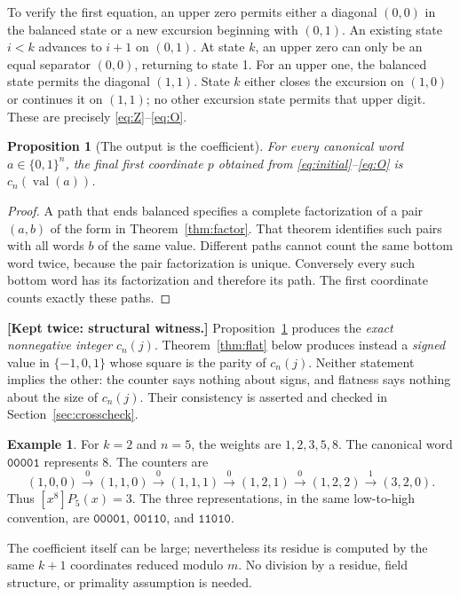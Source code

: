 \documentclass[11pt,letterpaper]{article}
\numberwithin{equation}{section}
\newtheorem{proposition}[theorem]{Proposition}
\theoremstyle{definition}
\newtheorem{example}[theorem]{Example}
\theoremstyle{remark}
\newcommand{\val}{\operatorname{val}}
\newcommand{\bits}[1]{\mathtt{#1}}
\begin{document}
To verify the first equation, an upper zero permits either a diagonal
$(0,0)$ in the balanced state or a new excursion beginning with $(0,1)$.
An existing state $i<k$ advances to $i+1$ on $(0,1)$. At state $k$, an
upper zero can only be an equal separator $(0,0)$, returning to state 1.
For an upper one, the balanced state permits the diagonal $(1,1)$.
State $k$ either closes the excursion on $(1,0)$ or continues it on
$(1,1)$; no other excursion state permits that upper digit. These are
precisely \eqref{eq:Z}--\eqref{eq:O}.

\begin{proposition}[The output is the coefficient]
\label{prop:counter}
For every canonical word $a\in\{0,1\}^n$, the final first coordinate $p$
obtained from \eqref{eq:initial}--\eqref{eq:O} is $c_n(\val(a))$.
\end{proposition}
\begin{proof}
A path that ends balanced specifies a complete factorization of a pair
$(a,b)$ of the form in Theorem~\ref{thm:factor}. That theorem identifies
such pairs with all words $b$ of the same value. Different paths cannot
count the same bottom word twice, because the pair factorization is
unique. Conversely every such bottom word has its factorization and
therefore its path. The first coordinate counts exactly these paths.
\end{proof}

\noindent\textbf{[Kept twice: structural witness.]}
Proposition~\ref{prop:counter} produces the \emph{exact nonnegative integer}
$c_n(j)$. Theorem~\ref{thm:flat} below produces instead a \emph{signed}
value in $\{-1,0,1\}$ whose square is the parity of $c_n(j)$. Neither
statement implies the other: the counter says nothing about signs, and
flatness says nothing about the size of $c_n(j)$. Their consistency is
asserted and checked in Section~\ref{sec:crosscheck}.

\begin{example}
For $k=2$ and $n=5$, the weights are $1,2,3,5,8$. The canonical word
$\bits{00001}$ represents 8. The counters are
\[
 (1,0,0)\xrightarrow{0}(1,1,0)\xrightarrow{0}(1,1,1)
 \xrightarrow{0}(1,2,1)\xrightarrow{0}(1,2,2)
 \xrightarrow{1}(3,2,0).
\]
Thus $[x^8]P_5(x)=3$. The three representations, in the same low-to-high
convention, are $\bits{00001}$, $\bits{00110}$, and $\bits{11010}$.
\end{example}

The coefficient itself can be large; nevertheless its residue is computed
by the same $k+1$ coordinates reduced modulo $m$. No division by a residue,
field structure, or primality assumption is needed.
\end{document}

